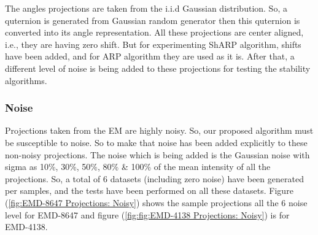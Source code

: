 \documentclass[twoside]{iitbreport}
\begin{document}
The angles projections are taken from the i.i.d Gaussian distribution. So, a quternion is generated from Gaussian random generator then this quternion is converted into its angle representation.  All these projections are center aligned, i.e., they are having zero shift. But for experimenting ShARP algorithm, shifts have been added, and for ARP algorithm they are used as it is.  After that, a different level of noise is being added to these projections for testing the stability algorithms.

\subsubsection{Noise}

Projections taken from the EM are highly noisy. So, our proposed algorithm must be susceptible to noise. So to make that noise has been added explicitly to these non-noisy projections. The noise which is being added is the Gaussian noise with sigma as 10\%, 30\%, 50\%, 80\% \& 100\%  of the mean intensity of all the projections. So, a total of  6 datasets (including zero noise) have been generated per samples, and the tests have been performed on all these datasets. Figure (\ref{fig:EMD-8647 Projections: Noisy}) shows the sample projections all the 6 noise level for EMD-8647 and figure (\ref{fig:fig:EMD-4138 Projections: Noisy}) is for EMD-4138.
\end{document}
